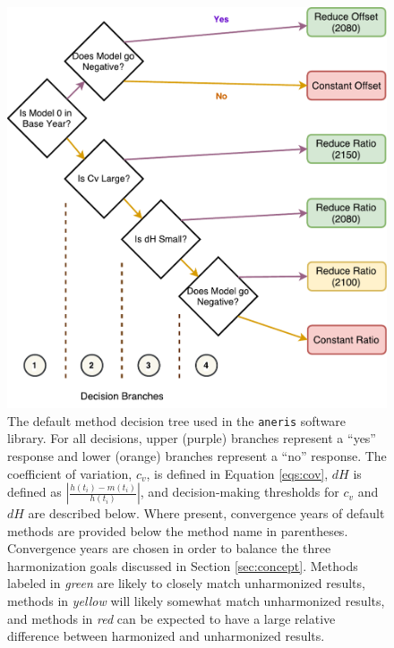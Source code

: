 \documentclass[review]{elsarticle}
\newcommand{\code}[1]{\lstinline[basicstyle=\ttfamily\color{black}]|#1|}
\begin{document}
\begin{figure}
  \begin{center}
    \includegraphics[width=\textwidth]{decision_tree.pdf}
    \caption[]{
      \label{fig:decision_tree}
      The default method decision tree used in the \code{aneris} software
      library. For all decisions, upper (purple) branches represent a ``yes''
      response and lower (orange) branches represent a ``no'' response. The
      coefficient of variation, $c_v$, is defined in Equation \ref{eqs:cov},
      $dH$ is defined as $\left|\frac{h(t_i) - m(t_i)}{h(t_i)}\right|$, and
      decision-making thresholds for $c_v$ and $dH$ are described below.  Where
      present, convergence years of default methods are provided below the
      method name in parentheses.  Convergence years are chosen in order to
      balance the three harmonization goals discussed in Section
      \ref{sec:concept}. Methods labeled in \textit{green} are likely to closely
      match unharmonized results, methods in \textit{yellow} will likely
      somewhat match unharmonized results, and methods in \textit{red} can be
      expected to have a large relative difference between harmonized and
      unharmonized results.}
  \end{center}
\end{figure}
\end{document}
